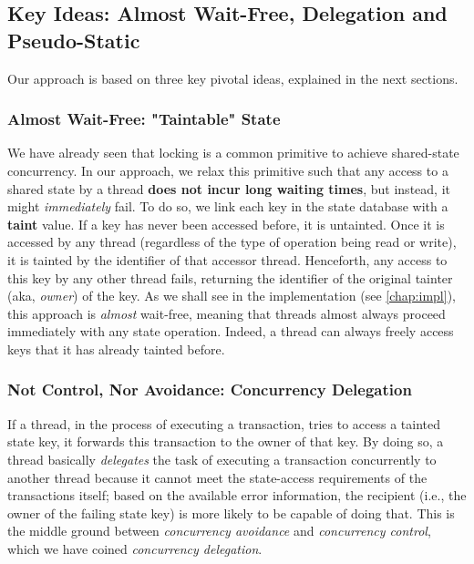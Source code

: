 \subsection{Key Ideas: Almost Wait-Free, Delegation and Pseudo-Static}

Our approach is based on three key pivotal ideas, explained in the next sections.

\subsubsection{Almost Wait-Free: "Taintable" State}\label{chapt_approach:subsubsec:taintable_state}

We have already seen that locking is a common primitive to achieve shared-state concurrency. In our
approach, we relax this primitive such that any access to a shared state by a thread \textbf{does
not incur long waiting times}, but instead, it might \textit{immediately} fail. To do so, we link
each key in the state database with a \textbf{taint} value. If a key has never been accessed before,
it is untainted. Once it is accessed by any thread (regardless of the type of operation being read
or write), it is tainted by the identifier of that accessor thread. Henceforth, any access to this
key by any other thread fails, returning the identifier of the original tainter (aka,
\textit{owner}) of the key. As we shall see in the implementation (see \ref{chap:impl}), this
approach is \textit{almost} wait-free, meaning that threads almost always proceed immediately with
any state operation. Indeed, a thread can always freely access keys that it has already tainted
before.

\subsubsection{Not Control, Nor Avoidance: Concurrency Delegation}

If a thread, in the process of executing a transaction, tries to access a tainted state key, it
forwards this transaction to the owner of that key. By doing so, a thread basically
\textit{delegates} the task of executing a transaction concurrently to another thread because it
cannot meet the state-access requirements of the transactions itself; based on the available error
information, the recipient (i.e., the owner of the failing state key) is more likely to be capable
of doing that. This is the middle ground between \textit{concurrency avoidance} and
\textit{concurrency control}, which we have coined \textit{concurrency delegation}.

